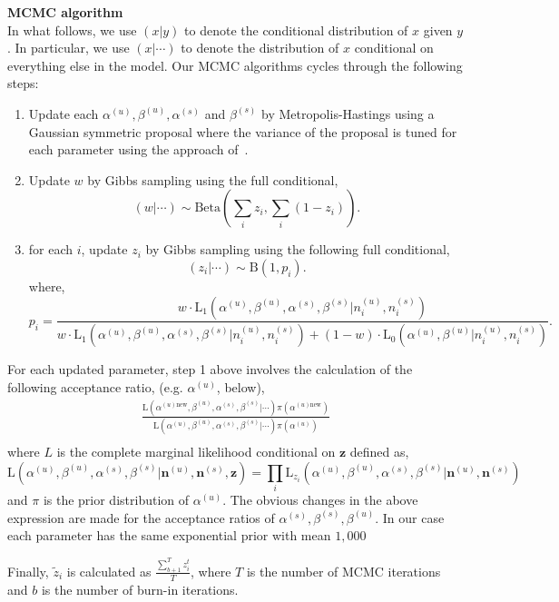 \documentclass{article}
\begin{document}
\noindent\textbf{MCMC algorithm}\\
In what follows, we use $(x|y)$ to denote the conditional distribution of $x$ given $y$. In particular, we use $(x|\cdots)$ to denote the distribution of $x$ conditional on everything else in the model. Our MCMC algorithms cycles through the following steps:
\begin{enumerate}
\item Update each $\alpha^{(u)}, \beta^{(u)}, \alpha^{(s)}$ and $\beta^{(s)}$ by Metropolis-Hastings using a Gaussian symmetric proposal where the variance of the proposal is tuned for each parameter using the approach of~\cite{Gelman:2004tc}.
\item Update $w$ by Gibbs sampling using the full conditional,
\[
(w|\cdots)\sim \mathrm{Beta}(\sum_i z_i,\sum_i (1-z_i)).
\]
\item for each $i$, update $z_i$ by Gibbs sampling using the following full conditional,
\[
(z_i|\cdots)\sim\mathrm{B}(1,p_i).
\]
where,
\[
p_i=\frac{w\cdot\mathrm{L_1}(\alpha^{(u)},\beta^{(u)},\alpha^{(s)},\beta^{(s)}| n^{(u)}_{i},n^{(s)}_{i})}{w\cdot\mathrm{L_1}(\alpha^{(u)},\beta^{(u)},\alpha^{(s)},\beta^{(s)}|n^{(u)}_{i},n^{(s)}_{i})+(1-w)\cdot\mathrm{L_0}(\alpha^{(u)},\beta^{(u)}|n^{(u)}_{i},n^{(s)}_{i})}.
\]
\end{enumerate}
For each updated parameter, step 1 above involves the calculation of the following acceptance ratio, (e.g. $\alpha^{(u)}$, below),
\[
\begin{split}
\frac{\mathrm{L}(\alpha^{(u)\text{new}},\beta^{(u)},\alpha^{(s)},\beta^{(s)}|\cdots)\pi(\alpha^{(u)\text{new}})}{\mathrm{L}(\alpha^{(u)},\beta^{(u)},\alpha^{(s)},\beta^{(s)}|\cdots)\pi(\alpha^{(u)})}\\
\end{split}
\]
where $L$ is the complete marginal likelihood conditional on $\mathbf{z}$ defined as,
\[
\mathrm{L}(\alpha^{(u)},\beta^{(u)},\alpha^{(s)},\beta^{(s)}|\mathbf{n}^{(u)},\mathbf{n}^{(s)},\mathbf{z})=\prod_i\mathrm{L}_{z_i}(\alpha^{(u)},\beta^{(u)},\alpha^{(s)},\beta^{(s)}|\mathbf{n}^{(u)},\mathbf{n}^{(s)})
\]
and $\pi$ is the prior distribution of $\alpha^{(u)}$. The obvious changes in the above expression are made for the acceptance ratios of $\alpha^{(s)},\beta^{(s)},\beta^{(u)}$. In our case each parameter has the same exponential prior with mean $1,000$

Finally, $\tilde{z}_i$ is calculated as $\frac{\sum_{b+1}^T z^{t}_i}{T}$, where $T$ is the number of MCMC iterations and $b$ is the number of burn-in iterations.
\end{document}
